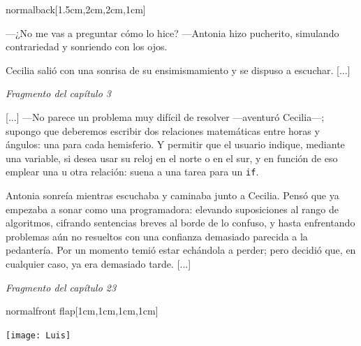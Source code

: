 \documentclass[coverwidth=148mm, coverheight=210mm, spinewidth=37mm,
flapwidth=7cm, wrapwidth=3mm, 11pt]{bookcover}
\begin{document}
\begin{bookcover}
\begin{bookcoverelement}{normal}{back}[1.5cm,2cm,2cm,1cm]
{      \hspace{.5em} ---¿No me vas a preguntar cómo lo hice? ---Antonia
      hizo pucherito, simulando contrariedad y sonriendo con los ojos.

      \hspace{.5em} Cecilia salió con una sonrisa de su
      ensimismamiento y se dispuso a escuchar. [...]
  

  \begin{flushright}
    \emph{Fragmento del capítulo 3}
  \end{flushright}

  \vspace{2.5em}
  
  \hspace{.5em} [...] ---No parece un problema muy difícil de resolver
  ---a\-ven\-tu\-ró Cecilia---; supongo que deberemos escribir dos
  relaciones matemáticas entre horas y ángulos: una para cada
  hemisferio. Y permitir que el usuario indique, mediante una
  variable, si desea usar su reloj en el norte o en el sur, y en
  función de eso emplear una u otra relación: suena a una tarea para
  un \texttt{if}.

  \hspace{.5em} Antonia sonreía mientras escuchaba y caminaba junto a
  Cecilia. Pensó que ya empezaba a sonar como una programadora:
  elevando suposiciones al rango de algoritmos, cifrando sentencias
  breves al borde de lo confuso, y hasta enfrentando problemas aún no
  resueltos con una confianza demasiado parecida a la pedantería. Por
  un momento temió estar echándola a perder; pero decidió que, en
  cualquier caso, ya era demasiado tarde. [...]

  \begin{flushright}
    \emph{Fragmento del capítulo 23}
  \end{flushright}
}
  
  \end{bookcoverelement}

  \begin{bookcoverelement}{normal}{front flap}[1cm,1cm,1cm,1cm]

    \begin{center}
      \texttt{[image: Luis]}
    \end{center}

    \bigskip
    

\end{bookcoverelement}
\end{bookcover}
\end{document}
